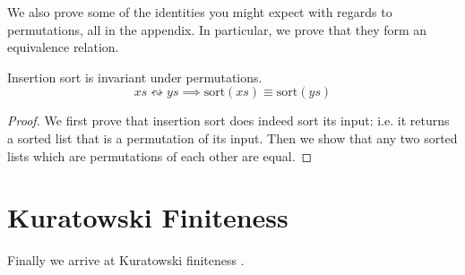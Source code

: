 We also prove some of the identities you might expect with regards to
permutations, all in the appendix.
In particular, we prove that they form an equivalence relation.
\begin{rm-lemma}
  Insertion sort is invariant under permutations.
  \begin{equation}
    \mathit{xs} \leftrightsquigarrow \mathit{ys} \implies \text{sort}(\mathit{xs}) \equiv \text{sort}(\mathit{ys})
  \end{equation}
\end{rm-lemma}
\begin{proof}
  We first prove that insertion sort does indeed sort its input: i.e. it returns
  a sorted list that is a permutation of its input.
  Then we show that any two sorted lists which are permutations of each other
  are equal.
\end{proof}
\section{Kuratowski Finiteness} \label{kuratowski}
Finally we arrive at Kuratowski finiteness
\cite{kuratowskiNotionEnsembleFini1920}.
